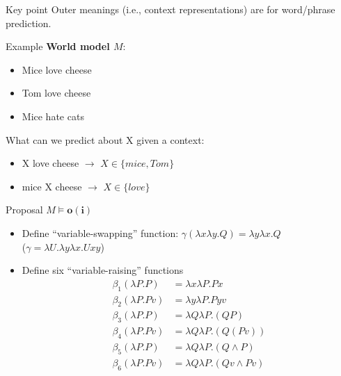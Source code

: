\documentclass[10pt,handout]{beamer}
\begin{document}
\begin{frame}
\begin{block}{Key point}
Outer meanings (i.e., context representations) are for word/phrase prediction.
\end{block}

\begin{block}{Example}
\textbf{World model $M$}:
\begin{itemize}
	\item Mice love cheese
	\item Tom love cheese
	\item Mice hate cats
\end{itemize}
What can we predict about X given a context:
\begin{itemize}
	\item X love cheese $\rightarrow$ $X \in \{mice,Tom\}$
	\item mice X cheese $\rightarrow$ $X \in \{love\}$
\end{itemize}
\end{block}

\pause
\begin{block}{Proposal}
$ M \models \mathbf{o} (\mathbf{i})$
\end{block}
\end{frame}

\begin{frame}
\begin{itemize}
	\item Define ``variable-swapping'' function: $\gamma(\lambda x \lambda y.Q) = \lambda y \lambda x.Q$\\
	($\gamma = \lambda U. \lambda y \lambda x. Uxy$)
	
	\pause
	\item Define six ``variable-raising'' functions
	\begin{align*}
		\beta_1(\lambda P.P) &= \lambda x \lambda P. Px \\
		\beta_2(\lambda P.Pv) &= \lambda y \lambda P. Pyv \\
		\beta_3(\lambda P.P) &= \lambda Q \lambda P. (Q P) \\
		\beta_4(\lambda P.Pv) &= \lambda Q \lambda P. (Q (Pv)) \\
		\beta_5(\lambda P.P) &= \lambda Q \lambda P. (Q \wedge P) \\
		\beta_6(\lambda P.Pv) &= \lambda Q \lambda P. (Qv \wedge Pv)
	\end{align*}
	
\end{itemize}
\end{frame}
\end{document}
